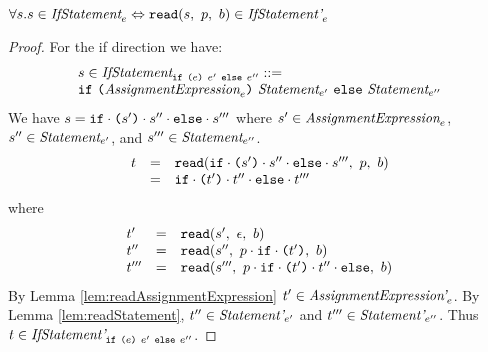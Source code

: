 \documentclass[preprint,10pt]{sigplanconf}
\begin{document}
\begin{lemma}\mbox{}
  
  \( \forall s. s \in \textit{IfStatement}_{e} \Leftrightarrow 
  \texttt{read}(s,~p,~b) \in \textit{IfStatement'}_{e} \)
\end{lemma}
\begin{proof}
  For the if direction we have:
  \[
  \begin{array}{lcl}
    s \in
    \textit{IfStatement}_{\texttt{if}~\texttt{(}e\texttt{)}~e'~\texttt{else}~ e''} 
    ::= 
    \\
    \texttt{if}~ \texttt{(}\textit{AssignmentExpression}_{e}\texttt{)}~
    \textit{Statement}_{e'}~\texttt{else}~ \textit{Statement}_{e''} 
  \end{array}
  \]
  We have \( s = \texttt{if}\cdot \texttt{(}s'\texttt{)}\cdot s''\cdot
  \texttt{else}\cdot s''' \) where \( s' \in
  \textit{AssignmentExpression}_{e} \), \( s'' \in \textit{Statement}_{e'}
  \), and \( s''' \in \textit{Statement}_{e''} \).
  \[
  \begin{array}{rcl}
    t &=& \texttt{read}(
      \texttt{if}\cdot \texttt{(}s'\texttt{)}\cdot s'' \cdot \texttt{else}
      \cdot s'''
    ,~p,~b)
    \\
    &=& \texttt{if} \cdot \texttt{(}t'\texttt{)} \cdot t'' \cdot \texttt{else}
    \cdot t'''
  \end{array}
  \]
  where 
  \[ 
  \begin{array}{lcl}
    t' &=& \texttt{read}(s',~\epsilon,~b)
    \\
    t'' &=& \texttt{read}(s'',~
      p \cdot \texttt{if} \cdot \texttt{(}t'\texttt{)}
    ,~b)
    \\
    t''' &=& \texttt{read}(s''',~
      p \cdot \texttt{if} \cdot \texttt{(}t'\texttt{)}
      \cdot t'' \cdot \texttt{else}
    ,~b)
  \end{array}
  \]
  By Lemma \ref{lem:readAssignmentExpression} \( t' \in
  \textit{AssignmentExpression'}_{e} \). By Lemma
  \ref{lem:readStatement}, \( t'' \in \textit{Statement'}_{e'} \) and \(
  t''' \in \textit{Statement'}_{e''} \). Thus \( t \in \textit{IfStatement'}_{\texttt{if}~\texttt{(}e\texttt{)}~e'~\texttt{else}~e''} \).
\end{proof}
\end{document}
